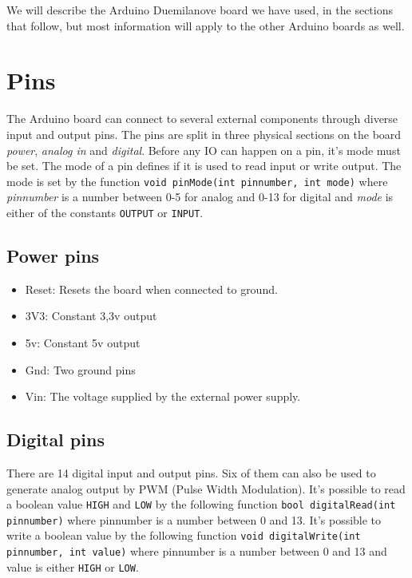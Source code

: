 \documentclass[a4paper, oneside, draft]{memoir}
\begin{document}
We will describe the Arduino Duemilanove board we have used, in the
sections that follow, but most information will apply to
the other Arduino boards as well.

\section{Pins}
The Arduino board can connect to several external components through
diverse input and output pins. The pins are split in three physical sections on
the board \textit{power}, \textit{analog in} and
\textit{digital}. Before any IO can happen on a pin, it's mode must be
set. The mode of a pin defines if it is used to read input or
write output. The mode is set by the function \texttt{void pinMode(int
  pinnumber, int mode)} where \textit{pinnumber} is a number between
0-5 for analog and 0-13 for digital and \textit{mode} is either of the constants
\texttt{OUTPUT} or \texttt{INPUT}.

\subsection{Power pins}
\begin{itemize}
\item Reset: Resets the board when connected to ground.
\item 3V3: Constant 3,3v output
\item 5v: Constant 5v output
\item Gnd: Two ground pins
\item Vin: The voltage supplied by the external power supply.
\end{itemize}

\subsection{Digital pins}
There are 14 digital input and output pins. Six of them can also be
used to generate analog output by PWM (Pulse Width Modulation). It's
possible to read a boolean value \texttt{HIGH} and \texttt{LOW} by the
following function \texttt{bool digitalRead(int pinnumber)} where
pinnumber is a number between 0 and 13. It's possible to write a
boolean value by the following function \texttt{void digitalWrite(int
  pinnumber, int value)} where pinnumber is a number between 0 and 13
and value is either \texttt{HIGH} or \texttt{LOW}.
\end{document}
